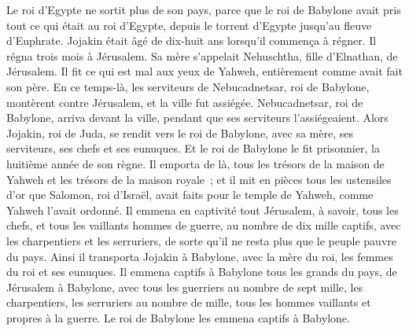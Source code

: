 \begin{multicols}{2}
Le roi d'Egypte ne sortit plus de son pays, parce que le roi de Babylone avait pris tout ce qui était au roi d'Egypte, depuis le torrent d'Egypte jusqu'au fleuve d'Euphrate.
Jojakin était âgé de dix-huit ans lorsqu'il commença à régner. Il régna trois mois à Jérusalem. Sa mère s'appelait Nehuschtha, fille d'Elnathan, de Jérusalem.
Il fit ce qui est mal aux yeux de Yahweh, entièrement comme avait fait son père.
En ce temps-là, les serviteurs de Nebucadnetsar, roi de Babylone, montèrent contre Jérusalem, et la ville fut assiégée.
Nebucadnetsar, roi de Babylone, arriva devant la ville, pendant que ses serviteurs l'assiégeaient.
Alors Jojakin, roi de Juda, se rendit vers le roi de Babylone, avec sa mère, ses serviteurs, ses chefs et ses eunuques. Et le roi de Babylone le fit prisonnier, la huitième année de son règne.
Il emporta de là, tous les trésors de la maison de Yahweh et les trésors de la maison royale~; et il mit en pièces tous les ustensiles d'or que Salomon, roi d'Israël, avait faits pour le temple de Yahweh, comme Yahweh l'avait ordonné.
Il emmena en captivité tout Jérusalem, à savoir, tous les chefs, et tous les vaillants hommes de guerre, au nombre de dix mille captifs, avec les charpentiers et les serruriers, de sorte qu'il ne resta plus que le peuple pauvre du pays.
Ainsi il transporta Jojakin à Babylone, avec la mère du roi, les femmes du roi et ses eunuques. Il emmena captifs à Babylone tous les grands du pays, de Jérusalem à Babylone,
avec tous les guerriers au nombre de sept mille, les charpentiers, les serruriers au nombre de mille, tous les hommes vaillants et propres à la guerre. Le roi de Babylone les emmena captifs à Babylone.

\end{multicols}
